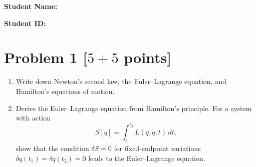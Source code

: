 \documentclass[11pt, a4paper]{article} %
\begin{document}
\begin{center}
{\Large \textbf{Student Name:} \underline{\hspace{4cm}}}
\vspace*{8mm}

{\Large \textbf{Student ID:} \underline{\hspace{4cm}}}
\vspace*{2mm}
\end{center}

\newpage
\section*{Problem 1 [$5 + 5$ points]}
\begin{enumerate}
  \item[(1)] Write down Newton's second law, the Euler--Lagrange equation, and Hamilton's equations of motion.

  \item[(2)] Derive the Euler--Lagrange equation from Hamilton's principle. For a system with action
  \[
  S[q]=\int_{t_1}^{t_2} L(q,\dot{q},t)\,dt,
  \]
  show that the condition $\delta S=0$ for fixed-endpoint variations $\delta q(t_1)=\delta q(t_2)=0$ leads to the Euler--Lagrange equation.

\end{enumerate}
\end{document}
